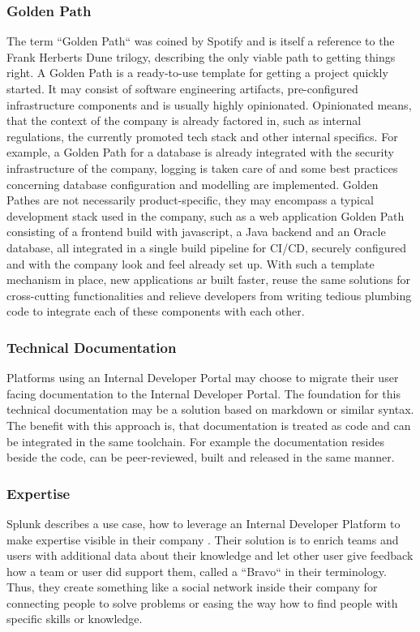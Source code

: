 \documentclass[a4paper,12pt]{article}
\begin{document}
    \subsubsection{Golden Path}
    The term ``Golden Path`` was coined by Spotify\parencite{spotifygoldenpath} and is itself a reference to the Frank
    Herberts Dune trilogy, describing the only viable path to getting things right.
    A Golden Path is a ready-to-use template for getting a project quickly started.
    It may consist of software engineering artifacts, pre-configured infrastructure components and is usually highly
    opinionated.
    Opinionated means, that the context of the company is already factored in, such as internal regulations,
    the currently promoted tech stack and other internal specifics.
    For example, a Golden Path for a database is already integrated with the security infrastructure of the company,
    logging is taken care of and some best practices concerning database configuration and modelling are implemented.
    Golden Pathes are not necessarily product-specific, they may encompass a typical development stack used
    in the company, such as a web application Golden Path consisting of a frontend build with javascript, a Java backend
    and an Oracle database, all integrated in a single build pipeline for CI/CD, securely configured and with the
    company look and feel already set up.
    With such a template mechanism in place, new applications ar built faster, reuse the same solutions for cross-cutting
    functionalities and relieve developers from writing tedious plumbing code to integrate each of these components with
    each other.

    \subsubsection{Technical Documentation}
    Platforms using an Internal Developer Portal may choose to migrate their user facing documentation to the Internal
    Developer Portal.
    The foundation for this technical documentation may be a solution based on markdown\parencite{backstagetechdocs}
    or similar syntax.
    The benefit with this approach is, that documentation is treated as code and can be integrated in the same toolchain.
    For example the documentation resides beside the code, can be peer-reviewed, built and released in the same manner.

    \subsubsection{Expertise}
    Splunk describes a use case, how to leverage an Internal Developer Platform to make expertise visible in their
    company\parencite{splunkidp} .
    Their solution is to enrich teams and users with additional data about their knowledge and let other user give feedback
    how a team or user did support them, called a ``Bravo`` in their terminology.
    Thus, they create something like a social network inside their company for connecting people to solve problems or
    easing the way how to find people with specific skills or knowledge.
\end{document}
